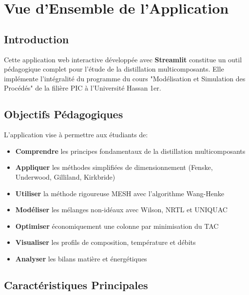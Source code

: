 \documentclass[11pt,a4paper]{article}
\begin{document}
\tableofcontents
\newpage

\section{Vue d'Ensemble de l'Application}

\subsection{Introduction}

Cette application web interactive développée avec \textbf{Streamlit} constitue un outil pédagogique complet pour l'étude de la distillation multicomposants. Elle implémente l'intégralité du programme du cours "Modélisation et Simulation des Procédés" de la filière PIC à l'Université Hassan 1er.

\subsection{Objectifs Pédagogiques}

L'application vise à permettre aux étudiants de:

\begin{itemize}[leftmargin=*]
    \item \textbf{Comprendre} les principes fondamentaux de la distillation multicomposants
    \item \textbf{Appliquer} les méthodes simplifiées de dimensionnement (Fenske, Underwood, Gilliland, Kirkbride)
    \item \textbf{Utiliser} la méthode rigoureuse MESH avec l'algorithme Wang-Henke
    \item \textbf{Modéliser} les mélanges non-idéaux avec Wilson, NRTL et UNIQUAC
    \item \textbf{Optimiser} économiquement une colonne par minimisation du TAC
    \item \textbf{Visualiser} les profils de composition, température et débits
    \item \textbf{Analyser} les bilans matière et énergétiques
\end{itemize}

\subsection{Caractéristiques Principales}
\end{document}
